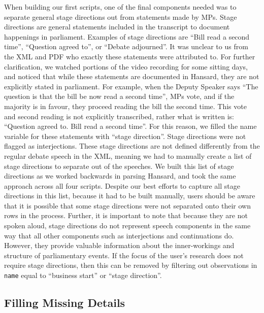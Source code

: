 \documentclass[
  letterpaper,
  DIV=11,
  numbers=noendperiod]{scrartcl}
\begin{document}
When building our first scripts, one of the final components needed was
to separate general stage directions out from statements made by MPs.
Stage directions are general statements included in the transcript to
document happenings in parliament. Examples of stage directions are
``Bill read a second time'', ``Question agreed to'', or ``Debate
adjourned''. It was unclear to us from the XML and PDF who exactly these
statements were attributed to. For further clarification, we watched
portions of the video recording for some sitting days, and noticed that
while these statements are documented in Hansard, they are not
explicitly stated in parliament. For example, when the Deputy Speaker
says ``The question is that the bill be now read a second time'', MPs
vote, and if the majority is in favour, they proceed reading the bill
the second time. This vote and second reading is not explicitly
transcribed, rather what is written is: ``Question agreed to. Bill read
a second time''. For this reason, we filled the name variable for these
statements with ``stage direction''. Stage directions were not flagged
as interjections. These stage directions are not defined differently
from the regular debate speech in the XML, meaning we had to manually
create a list of stage directions to separate out of the speeches. We
built this list of stage directions as we worked backwards in parsing
Hansard, and took the same approach across all four scripts. Despite our
best efforts to capture all stage directions in this list, because it
had to be built manually, users should be aware that it is possible that
some stage directions were not separated onto their own rows in the
process. Further, it is important to note that because they are not
spoken aloud, stage directions do not represent speech components in the
same way that all other components such as interjections and
continuations do. However, they provide valuable information about the
inner-workings and structure of parliamentary events. If the focus of
the user's research does not require stage directions, then this can be
removed by filtering out observations in \texttt{name} equal to
``business start'' or ``stage direction''.

\hypertarget{filling-missing-details}{%
\subsection{Filling Missing Details}\label{filling-missing-details}}
\end{document}
